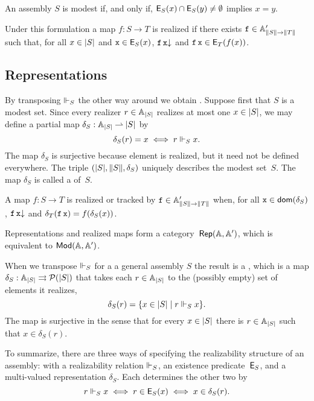 An assembly $S$ is modest if, and only if, $\Ex{S}(x) \cap \Ex{S}(y) \neq \emptyset$ implies $x = y$.

Under this formulation a map $f : S \to T$ is realized if there exists $\R{f} \in \subAtyp{\T{S} \to \T{T}}$ such that, for all $x \in \S{S}$ and $\R{x} \in \Ex{S}(x)$, $\defined{\R{f}\,\R{x}}$ and $\R{f}\,\R{x} \in \Ex{T}(f(x))$.

\subsection{Representations}
\label{sec:representations}

By transposing $\rz[S]$ the other way around we obtain . Suppose first that $S$ is a modest set. Since every realizer $r \in \xAtyp{S}$ realizes at most one $x \in \S{S}$, we may define a partial map $\delta_S : \xAtyp{S} \parto \S{S}$ by
%
\begin{equation*}
  \delta_S(r) = x \iff r \rz[S] x.
\end{equation*}
%
The map $\delta_S$ is surjective because element is realized, but it need not be defined everywhere. The triple $(\S{S}, \T{S}, \delta_S)$ uniquely describes the modest set~$S$. The map $\delta_S$ is called a  of~$S$.

A map $f : S \to T$ is realized or tracked by $\R{f} \in \subAtyp{\T{S} \to \T{T}}$ when, for all $\R{x} \in \dom{\delta_S}$, $\defined{\R{f}\,\R{x}}$ and $\delta_T(\R{f}\,\R{x}) = f(\delta_S(x))$.

Representations and realized maps form a category~$\Rep{\AA,\subAA}$, which is equivalent to $\Mod{\AA, \subAA}$.

When we transpose $\rz[S]$ for a a general assembly $S$ the result is a , which is a map $\delta_S : \xAtyp{S} \multito \pow{\S{S}}$ that takes each $r \in \xAtyp{S}$ to the (possibly empty) set of elements it realizes,
%
\begin{equation*}
  \delta_S(r) = \set{ x \in \S{S} \such r \rz[S] x}.
\end{equation*}
%
The map is surjective in the sense that for every $x \in \S{S}$ there is $r \in \xAtyp{S}$ such that $x \in \delta_S(r)$.

To summarize, there are three ways of specifying the realizability structure of an assembly: with a realizability relation $\rz[S]$, an existence predicate~$\Ex{S}$, and a multi-valued representation $\delta_S$. Each determines the other two by
%
\begin{equation*}
  r \rz[S] x \iff
  r \in \Ex{S}(x) \iff
  x \in \delta_S(r).
\end{equation*}


